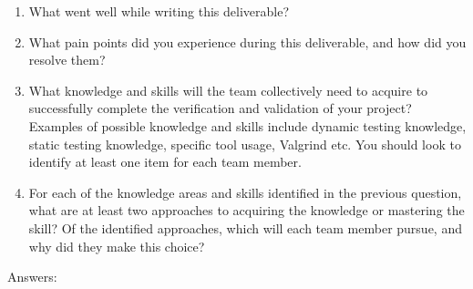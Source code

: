 \documentclass[12pt, titlepage]{article}
\begin{document}
\begin{enumerate}
  \item What went well while writing this deliverable? 
  \item What pain points did you experience during this deliverable, and how
    did you resolve them?
  \item What knowledge and skills will the team collectively need to acquire to
  successfully complete the verification and validation of your project?
  Examples of possible knowledge and skills include dynamic testing knowledge,
  static testing knowledge, specific tool usage, Valgrind etc.  You should look to
  identify at least one item for each team member.
  \item For each of the knowledge areas and skills identified in the previous
  question, what are at least two approaches to acquiring the knowledge or
  mastering the skill?  Of the identified approaches, which will each team
  member pursue, and why did they make this choice?
\end{enumerate}
Answers:
\end{document}
